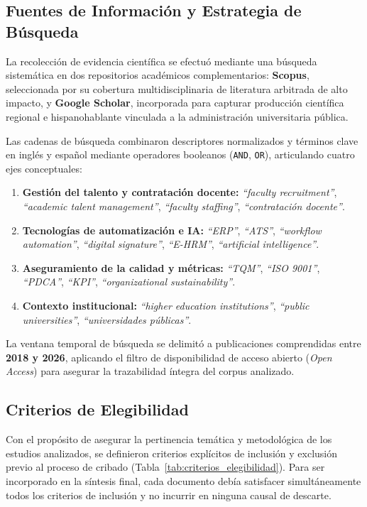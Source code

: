 \documentclass[conference]{IEEEtran}
\begin{document}
\subsection{Fuentes de Información y Estrategia de Búsqueda}
La recolección de evidencia científica se efectuó mediante una búsqueda sistemática en dos repositorios académicos complementarios: \textbf{Scopus}, seleccionada por su cobertura multidisciplinaria de literatura arbitrada de alto impacto, y \textbf{Google Scholar}, incorporada para capturar producción científica regional e hispanohablante vinculada a la administración universitaria pública.

Las cadenas de búsqueda combinaron descriptores normalizados y términos clave en inglés y español mediante operadores booleanos (\texttt{AND}, \texttt{OR}), articulando cuatro ejes conceptuales:
\begin{enumerate}
    \item \textbf{Gestión del talento y contratación docente:} \textit{``faculty recruitment''}, \textit{``academic talent management''}, \textit{``faculty staffing''}, \textit{``contratación docente''}.
    \item \textbf{Tecnologías de automatización e IA:} \textit{``ERP''}, \textit{``ATS''}, \textit{``workflow automation''}, \textit{``digital signature''}, \textit{``E-HRM''}, \textit{``artificial intelligence''}.
    \item \textbf{Aseguramiento de la calidad y métricas:} \textit{``TQM''}, \textit{``ISO 9001''}, \textit{``PDCA''}, \textit{``KPI''}, \textit{``organizational sustainability''}.
    \item \textbf{Contexto institucional:} \textit{``higher education institutions''}, \textit{``public universities''}, \textit{``universidades públicas''}.
\end{enumerate}

La ventana temporal de búsqueda se delimitó a publicaciones comprendidas entre \textbf{2018 y 2026}, aplicando el filtro de disponibilidad de acceso abierto (\textit{Open Access}) para asegurar la trazabilidad íntegra del corpus analizado.

\subsection{Criterios de Elegibilidad}
Con el propósito de asegurar la pertinencia temática y metodológica de los estudios analizados, se definieron criterios explícitos de inclusión y exclusión previo al proceso de cribado (Tabla~\ref{tab:criterios_elegibilidad}). Para ser incorporado en la síntesis final, cada documento debía satisfacer simultáneamente todos los criterios de inclusión y no incurrir en ninguna causal de descarte.
\end{document}
